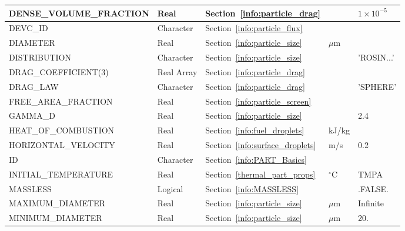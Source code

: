 \documentclass[11pt]{book}
\begin{document}
\begin{longtable}{@{\extracolsep{\fill}}|l|l|l|l|l|}
{\ct DENSE\_VOLUME\_FRACTION}            & Real            & Section~\ref{info:particle_drag}        &           & $1\times 10^{-5}$ \\ \hline
{\ct DEVC\_ID}                           & Character       & Section~\ref{info:particle_flux}        &           &               \\ \hline
{\ct DIAMETER}                           & Real            & Section~\ref{info:particle_size}        & $\mu$m    &               \\ \hline
{\ct DISTRIBUTION}                       & Character       & Section~\ref{info:particle_size}        &           & {\ct 'ROSIN...'} \\ \hline
{\ct DRAG\_COEFFICIENT(3)}               & Real Array      & Section~\ref{info:particle_drag}        &           &               \\ \hline
{\ct DRAG\_LAW}                          & Character       & Section~\ref{info:particle_drag}        &           & {\ct 'SPHERE'}\\ \hline
{\ct FREE\_AREA\_FRACTION}               & Real            & Section~\ref{info:particle_screen}      &           &               \\ \hline
{\ct GAMMA\_D}                           & Real            & Section~\ref{info:particle_size}        &           & 2.4           \\ \hline
{\ct HEAT\_OF\_COMBUSTION}               & Real            & Section~\ref{info:fuel_droplets}        & kJ/kg     &               \\ \hline
{\ct HORIZONTAL\_VELOCITY}               & Real            & Section~\ref{info:surface_droplets}     & m/s       &  0.2          \\ \hline
{\ct ID}                                 & Character       & Section~\ref{info:PART_Basics}          &           &               \\ \hline
{\ct INITIAL\_TEMPERATURE}               & Real            & Section~\ref{thermal_part_props}        & $^\circ$C & {\ct TMPA}    \\ \hline
{\ct MASSLESS}                           & Logical         & Section~\ref{info:MASSLESS}             &           & {\ct .FALSE.} \\ \hline
{\ct MAXIMUM\_DIAMETER}                  & Real            & Section~\ref{info:particle_size}        & $\mu$m    & Infinite      \\ \hline
{\ct MINIMUM\_DIAMETER}                  & Real            & Section~\ref{info:particle_size}        & $\mu$m    & 20.           \\ \hline

\end{longtable}
\end{document}
